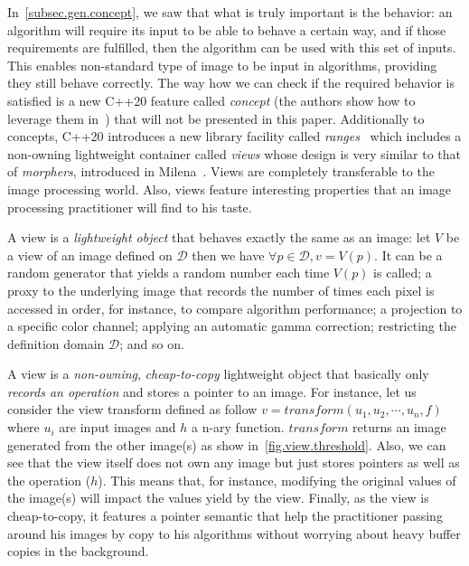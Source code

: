 \vspace{1cm}

In~\cref{subsec.gen.concept}, we saw that what is truly important is the behavior: an algorithm will require its input
to be able to behave a certain way, and if those requirements are fulfilled, then the algorithm can be used with this
set of inputs. This enables non-standard type of image to be input in algorithms, providing they still behave correctly.
The way how we can check if the required behavior is satisfied is a new C++20 feature called \emph{concept} (the authors
show how to leverage them in~\cite{roynard.2019.rrpr}) that will not be presented in this paper. Additionally to
concepts, C++20 introduces a new library facility called \emph{ranges}~\cite{niebler.2018.deepranges} which includes a
non-owning lightweight container called \emph{views} whose design is very similar to that of \emph{morphers}, introduced
in Milena~\cite{levillain.2009.ismm,geraud.2012.hdr}. Views are completely transferable to the image processing world.
Also, views feature interesting properties that an image processing practitioner will find to his taste.

A view is a \emph{lightweight object} that behaves exactly the same as an image: let $V$ be a view of an image defined
on $\mathcal{D}$ then we have $\forall{p}\in\mathcal{D}, v = V(p)$. It can be a random generator that yields a random
number each time $V(p)$ is called; a proxy to the underlying image that records the number of times each pixel is
accessed in order, for instance, to compare algorithm performance; a projection to a specific color channel; applying an
automatic gamma correction; restricting the definition domain $\mathcal{D}$; and so on.

A view is a \emph{non-owning}, \emph{cheap-to-copy} lightweight object that basically only \emph{records an operation}
and stores a pointer to an image. For instance, let us consider the view transform defined as follow $v = transform(u_1,
  u_2, \cdots, u_n, f)$ where $u_i$ are input images and $h$ a n-ary function. $transform$ returns an image generated from
the other image(s) as show in~\cref{fig.view.threshold}. Also, we can see that the view itself does not own any image
but just stores pointers as well as the operation ($h$). This means that, for instance, modifying the original values of
the image(s) will impact the values yield by the view. Finally, as the view is cheap-to-copy, it features a pointer
semantic that help the practitioner passing around his images by copy to his algorithms without worrying about heavy
buffer copies in the background.

